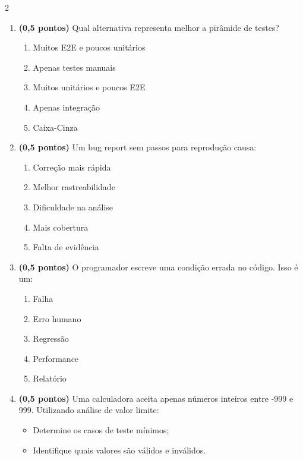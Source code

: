 \documentclass[a4paper,12pt]{article}
\begin{document}
\begin{multicols}{2}
\begin{enumerate}[leftmargin=*]
\vspace{0.2cm}

\item \textbf{(0,5 pontos)} Qual alternativa representa melhor a pirâmide de testes?

\begin{enumerate}[label=(\Alph*)]
\item Muitos E2E e poucos unitários
\item Apenas testes manuais
\item Muitos unitários e poucos E2E
\item Apenas integração
\item Caixa-Cinza
\end{enumerate}

\vspace{0.2cm}

\item \textbf{(0,5 pontos)} Um bug report sem passos para reprodução causa:

\begin{enumerate}[label=(\Alph*)]
\item Correção mais rápida
\item Melhor rastreabilidade
\item Dificuldade na análise
\item Mais cobertura
\item Falta de evidência
\end{enumerate}

\vspace{0.2cm}

\item \textbf{(0,5 pontos)} O programador escreve uma condição errada no código. Isso é um:

\begin{enumerate}[label=(\Alph*)]
\item Falha
\item Erro humano
\item Regressão
\item Performance
\item Relatório
\end{enumerate}

\vspace{0.2cm}

\item \textbf{(0,5 pontos)} Uma calculadora aceita apenas números inteiros entre -999 e 999. Utilizando análise de valor limite:

\begin{itemize}[itemsep=0pt, topsep=0pt]
    \item Determine os casos de teste mínimos;
    \item Identifique quais valores são válidos e inválidos.
\end{itemize}


\end{enumerate}
\end{multicols}
\end{document}
